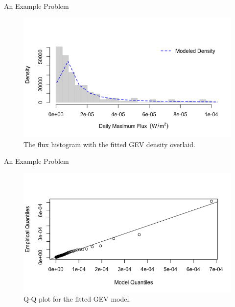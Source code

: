 \documentclass{beamer}
\begin{document}
\begin{frame}{An Example Problem}
    \begin{figure}
        \centering
        \includegraphics[scale=0.5]{daily_max_flux_hist3.png}
        \caption{The flux histogram with the fitted GEV density overlaid.}
        \label{fig:daily_max_flux_hist3}
    \end{figure}
\end{frame}

\begin{frame}{An Example Problem}
    \begin{figure}
        \centering
        \includegraphics[scale=0.5]{daily_max_flux_qq_plot.png}
        \caption{Q-Q plot for the fitted GEV model.}
        \label{fig:daily_max_flux_qq_plot}
    \end{figure}
\end{frame}
\end{document}
